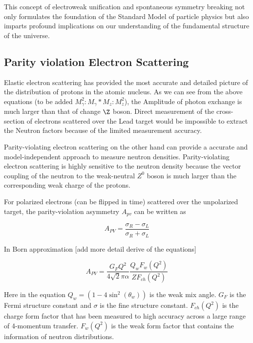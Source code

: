 This concept of electroweak unification and spontaneous symmetry breaking not only formulates the foundation of the Standard Model of particle physics but also imparts profound implications on our understanding of the fundamental structure of the universe. 


\subsection{Parity violation Electron Scattering}

Elastic electron scattering has provided the most accurate and detailed picture of the distribution of protons in the atomic nucleus. As we can see from the above equations (to be added  $M_\gamma^2:M_\gamma*M_z: M_z^2$), the Amplitude of photon exchange is much larger than that of change $\Z$ boson. Direct measurement of the cross-section of electrons scattered over the Lead target would be impossible to extract the Neutron factors because of the limited measurement accuracy.


Parity-violating electron scattering on the other hand can provide a accurate and model-independent approach to measure neutron densities. Parity-violating electron scattering is highly sensitive to the neutron density because the vector coupling of the neutron to the weak-neutral $Z^0$ boson is much larger than the corresponding weak charge of the protons. 

For polarized electrons (can be flipped in time) scattered over the unpolarized target, the parity-violation asymmetry $A_{pv}$ can be written as

\begin{equation}
    A_{PV} = \frac{\sigma_R - \sigma_L}{\sigma_R + \sigma_L}
\end{equation}

In Born approximation [add more detail derive of the equations]

\begin{equation}
    A_{PV} = \frac{G_FQ^2}{4\sqrt{2}\pi\alpha}\frac{Q_wF_w(Q^2)}{ZF_{ch}(Q^2)}
\end{equation}

Here in the equation $Q_w = (1-4\sin^2(\theta_w))$ is the weak mix angle. $G_F$ is the Fermi structure constant and $\sigma$ is the fine structure constant. $F_{ch}(Q^2)$ is the charge form factor that has been measured to high accuracy across a large range of 4-momentum transfer. $F_w(Q^2)$ is the weak form factor that contains the information of neutron distributions.



